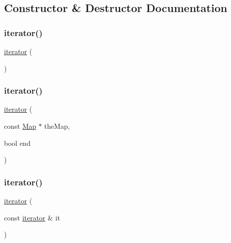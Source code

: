 \subsection{Constructor \& Destructor Documentation}
\mbox{\label{classMap_1_1iterator_a67d652c2433cf9217ed2a1485092fdd1}} 
\subsubsection{\texorpdfstring{iterator()}{iterator()}\hspace{0.1cm}{\footnotesize\ttfamily [1/3]}}
{\footnotesize\ttfamily \mbox{\hyperlink{classMap_1_1iterator}{iterator}} (\begin{DoxyParamCaption}{ }\end{DoxyParamCaption})\hspace{0.3cm}{\ttfamily [inline]}}

\mbox{\label{classMap_1_1iterator_a963233ec2eced24db44f8d6296317091}} 
\subsubsection{\texorpdfstring{iterator()}{iterator()}\hspace{0.1cm}{\footnotesize\ttfamily [2/3]}}
{\footnotesize\ttfamily \mbox{\hyperlink{classMap_1_1iterator}{iterator}} (\begin{DoxyParamCaption}\item[{const \mbox{\hyperlink{classMap}{Map}} $\ast$}]{the\+Map,  }\item[{bool}]{end }\end{DoxyParamCaption})\hspace{0.3cm}{\ttfamily [inline]}}

\mbox{\label{classMap_1_1iterator_a698b7553261e7209d6c29fb55627dce4}} 
\subsubsection{\texorpdfstring{iterator()}{iterator()}\hspace{0.1cm}{\footnotesize\ttfamily [3/3]}}
{\footnotesize\ttfamily \mbox{\hyperlink{classMap_1_1iterator}{iterator}} (\begin{DoxyParamCaption}\item[{const \mbox{\hyperlink{classMap_1_1iterator}{iterator}} \&}]{it }\end{DoxyParamCaption})\hspace{0.3cm}{\ttfamily [inline]}}



